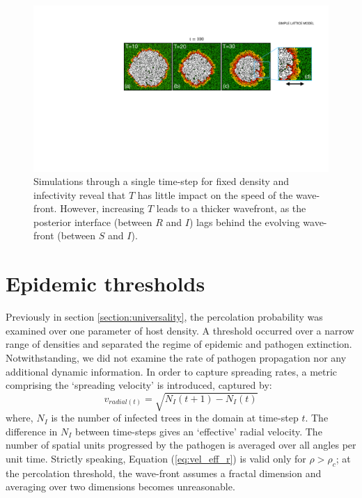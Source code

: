 \begin{figure}
    \centering
    \includegraphics[scale=0.35]{chapter3/figures/figure5_.pdf}
    \caption{Simulations through a single time-step for fixed density and infectivity reveal that $T$ has little impact on the speed of the wave-front. 
    However, increasing $T$ leads to a thicker wavefront, as the posterior interface (between $R$ and $I$) lags behind the evolving wave-front (between $S$ and $I$).}
    \label{fig:slm-wave-front}
\end{figure}

\newpage

\section{Epidemic thresholds}

Previously in section \ref{section:universality}, the percolation probability was examined over one parameter of host density.
A threshold occurred over a narrow range of densities and separated the regime of epidemic and pathogen extinction.
Notwithstanding, we did not examine the rate of pathogen propagation nor any additional dynamic information.
In order to capture spreading rates, a metric comprising the `spreading velocity' is introduced, captured by: 
\begin{equation}
\label{eq:vel_eff_r}
    v_{radial(t)}=\sqrt{N_I(t+1)-N_I(t)}
\end{equation} 
where, $N_I$ is the number of infected trees in the domain at time-step $t$. 
The difference in $N_I$ between time-steps gives an `effective' radial velocity. %
The number of spatial units progressed by the pathogen is averaged over all angles per unit time. %
Strictly speaking, Equation (\ref{eq:vel_eff_r}) is valid only for $\rho > \rho_c$; at the percolation threshold, the wave-front assumes a fractal dimension and averaging over two dimensions becomes unreasonable.

